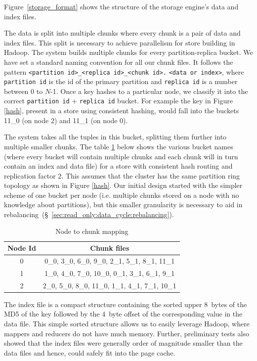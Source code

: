 Figure~\ref{storage_format} shows the structure of the storage
engine's data and index files. 

The data is split into multiple chunks where every chunk is a pair of
data and index files. This split is necessary to achieve parallelism
for store building in Hadoop. The system builds multiple chunks for
every partition-replica bucket. We have set a standard naming
convention for all our chunk files. It follows the pattern
\verb=<partition id>_<replica id>_<chunk id>.= \verb=<data or index>=,
where \verb=partition id= is the id of the primary partition and
\verb=replica id= is a number between 0 to $N$-1.
Once a key hashes to a particular node, we classify it into the
correct \verb=partition id= + \verb=replica id= bucket. For example
the key in Figure \ref{hash}, present in a store using consistent
hashing, would fall into the buckets 11\_0 (on node 2) and 11\_1 (on
node 0). 

The system takes all the tuples in this bucket, splitting them further
into multiple smaller chunks. The table \ref{tab:node_to_chunk} below
shows the various bucket names (where every bucket will contain
multiple chunks and each chunk will in turn contain an index and data
file) for a store with consistent hash routing and replication factor
2. This assumes that the cluster has the same partition ring topology
as shown in Figure \ref{hash}. Our initial design started with the
simpler scheme of one bucket per node (i.e. multiple chunks stored on
a node with no knowledge about partitions), but this smaller
granularity is necessary to aid in
rebalancing~(\S~\ref{sec:read_only:data_cycle:rebalancing}).

\begin{table}
\begin{center}
    \begin{tabular}{ | c | c | }
    \hline
    Node Id & Chunk files \\ \hline
    0 &  0\_0, 3\_0, 6\_0, 9\_0,      2\_1, 5\_1, 8\_1, 11\_1	\\
   1 &   1\_0, 4\_0, 7\_0, 10\_0,      0\_1, 3\_1, 6\_1, 9\_1		\\
   2 &    2\_0, 5\_0, 8\_0, 11\_0,    1\_1, 4\_1, 7\_1, 10\_1		\\
\hline
    \end{tabular}
\end{center}
 	\caption{Node to chunk mapping}
 	\label{tab:node_to_chunk}
\end{table}

The index file is a compact structure containing the sorted upper
8~bytes of the MD5 of the key followed by the 4~byte offset of the
corresponding value in the data file. This simple sorted structure
allows us to easily leverage Hadoop, where mappers and reducers do not
have much memory. Further, preliminary tests also showed that the
index files were generally order of magnitude smaller than the data
files and hence, could safely fit into the page cache.


